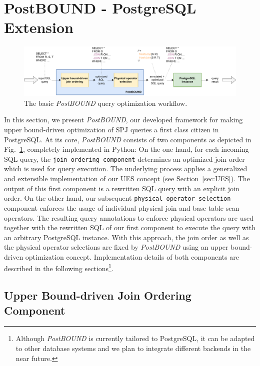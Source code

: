 \section{PostBOUND - PostgreSQL Extension}
\label{sec:PostBound}

\begin{figure}[tb]
	\centering
	\includegraphics[width=0.95\linewidth]{figures/postbound-workflow-rework.pdf}
	\caption{The basic \emph{PostBOUND} query optimization workflow.}
	\label{fig:postbound-workflow}
	\vspace{-0.4cm}
\end{figure}

In this section, we present \emph{PostBOUND}, our developed framework for making upper bound-driven optimization of SPJ queries a first class citizen in PostgreSQL.
At its core, \emph{PostBOUND} consists of two components as depicted in Fig.~\ref{fig:postbound-workflow}, completely implemented in Python: 
On the one hand, for each incoming SQL query, the \texttt{join ordering component} determines an optimized join order which is used for query execution. 
The underlying process applies a generalized and extensible implementation of our UES concept (see Section~\ref{sec:UES}). 
The output of this first component is a rewritten SQL query with an explicit join order.
On the other hand, our subsequent \texttt{physical operator selection} component enforces the usage of individual physical join and base table scan operators. 
The resulting query annotations to enforce physical operators are used together with the rewritten SQL of our first component to execute the query with an arbitrary PostgreSQL instance.
With this approach, the join order as well as the physical operator selections are fixed by \emph{PostBOUND} using an upper bound-driven optimization concept. 
Implementation details of both components are described in the following sections\footnote{ 
Although \emph{PostBOUND} is currently tailored to PostgreSQL, it can be adapted to other database systems and we plan to integrate different backends in the near future.}.

\subsection{Upper Bound-driven Join Ordering Component}
\label{sec:postbound-join-ordering}

